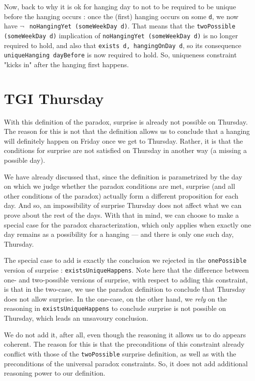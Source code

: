 \documentclass[journal]{journal}
\begin{document}
Now, back to why it is ok for hanging day to not to be required to be unique
before the hanging occurs : once the (first) hanging
occurs on some {\tt d}, we now have {\tt $\neg~$ noHangingYet (someWeekDay d)}.
That means that the {\tt twoPossible (someWeekDay d)} implication of {\tt noHangingYet (someWeekDay d)}
is no longer required to hold, and also that {\tt exists d, hangingOnDay d}, so
its consequence {\tt uniqueHanging dayBefore} is now required to hold.
So, uniqueness constraint "kicks in" after the hanging first happens.

\section{TGI Thursday}
\label{sec:tgit}

With this definition of the paradox, surprise is already not possible on Thursday.
The reason for this is not that the definition allows us to conclude that a hanging will
definitely happen on Friday once we get to Thursday. Rather, it is that the
conditions for surprise are not satisfied on Thursday in another way (a missing
a possible day).

We have already discussed that, since the definition
is parametrized by the day on which we judge whether the paradox conditions
are met, surprise (and all other conditions of the paradox) actually form
a different proposition for each day. And so, an impossibility of surprise
Thursday does not affect what we can prove about the rest of the days.
With that in mind, we can choose to make a special case
for the paradox characterization, which only applies when exactly one day remains as a possibility
for a hanging --- and there is only one such day, Thursday.

The special case to add is exactly the conclusion we rejected in the {\tt onePossible}
version of surprise : {\tt existsUniqueHappens}. Note here that
the difference between one- and two-possible versions of surprise, with respect
to adding this constraint,
is that in the two-case, we use the paradox definition to conclude that Thursday
does not allow surprise. In the one-case, on the other hand, we \emph{rely} on the reasoning in
{\tt existsUniqueHappens} to conclude surprise is not possible on Thursday,
which leads an unsavoury conclusion.

We do not add it, after all, even though the reasoning it allows us to do
appears coherent. The reason for this is that the preconditions of this
constraint already conflict with those of the {\tt twoPossible} surprise definition, as well
as with the preconditions of the universal paradox constraints. So, it does not
add additional reasoning power to our definition.
\end{document}
